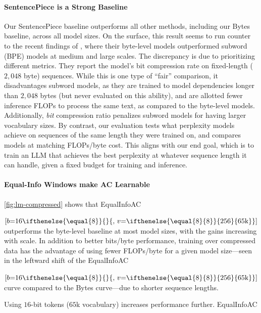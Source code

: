 \paragraph{SentencePiece is a Strong Baseline} Our SentencePiece baseline outperforms all other methods, including our Bytes baseline, across all model sizes. On the surface, this result seems to run counter to the recent findings of \citet{deletangLanguageModelingCompression2024}, where their byte-level models outperformed subword (BPE) models at medium and large scales. The discrepancy is due to prioritizing different metrics. They report the model's bit compression rate on fixed-length ($2{,}048$ byte) sequences. While this is one type of ``fair'' comparison, it disadvantages subword models, as they are trained to model dependencies longer than $2{,}048$ bytes (but never evaluated on this ability), and are allotted fewer inference FLOPs to process the same text, as compared to the byte-level models. Additionally, \emph{bit} compression ratio penalizes subword models for having larger vocabulary sizes. By contrast, our evaluation tests what perplexity models achieve on sequences of the same length they were trained on, and compares models at matching FLOPs/byte cost. This aligns with our end goal, which is to train an LLM that achieves the best perplexity at whatever sequence length it can handle, given a fixed budget for training and inference.

\paragraph{Equal-Info Windows make AC Learnable} \ref{fig:lm-compressed} shows that EqualInfoAC

  {$[b\mathord{=}16\ifthenelse{\equal{8}}{}{,\,v\mathord{=}\ifthenelse{\equal{8}{8}}{256}{65\text{k}}}]$} outperforms the byte-level baseline at most model sizes, with the gains increasing with scale. In addition to better bits/byte performance, training over compressed data has the advantage of using fewer FLOPs/byte for a given model size---seen in the leftward shift of the EqualInfoAC

  {$[b\mathord{=}16\ifthenelse{\equal{8}}{}{,\,v\mathord{=}\ifthenelse{\equal{8}{8}}{256}{65\text{k}}}]$} curve compared to the Bytes curve---due to shorter sequence lengths.

Using $16$-bit tokens ($65$k vocabulary) increases performance further. EqualInfoAC

